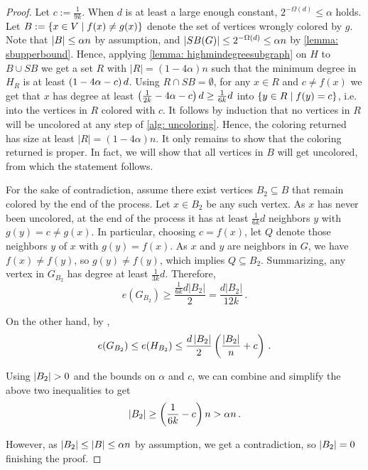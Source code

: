 
\begin{proof}
    Let $c:=\frac{1}{9k}$. When $d$ is at least a large enough constant, $2^{-\Omega(d)}\leq \alpha$ holds. Let $B:=\left\{x\in V\mid f(x)\neq g(x)\right\}$ denote the set of vertices wrongly colored by $g$. Note that $\left\lvert B\right\rvert\leq \alpha n$ by assumption, and $\left\lvert SB(G)\right\rvert\leq 2^{-\Omega(d)}\leq \alpha n$ by \cref{lemma: sbupperbound}. Hence, applying \cref{lemma: highmindegreesubgraph} on $H$ to $B\cup SB$ we get a set $R$ with $|R|=(1-4\alpha)n$ such that the minimum degree in $H_R$ is at least $\left(1-4\alpha-c\right)d$. Using $R\cap SB=\emptyset$, for any $x\in R$ and $c\neq f(x)$ we get that $x$ has degree at least $\left(\frac{1}{2k}-4\alpha-c\right)d\geq \frac{1}{6k}d$ into $\left\{y\in R\mid f(y)=c\right\}$, i.e. into the vertices in $R$ colored with $c$. It follows by induction that no vertices in $R$ will be uncolored at any step of \cref{alg: uncoloring}. Hence, the coloring returned has size at least $|R|=(1-4\alpha)n$. It only remains to show that the coloring returned is proper. In fact, we will show that all vertices in $B$ will get uncolored, from which the statement follows.

    For the sake of contradiction, assume there exist vertices $B_2\subseteq B$ that remain colored by the end of the process. Let $x\in B_2$ be any such vertex. As $x$ has never been uncolored, at the end of the process it has at least $\frac{1}{6k}d$ neighbors $y$ with $g(y)=c\neq g(x)$. In particular, choosing $c=f(x)$, let $Q$ denote those neighbors $y$ of $x$ with $g(y)=f(x)$. As $x$ and $y$ are neighbors in $G$, we have $f(x)\neq f(y)$, so $g(y)\neq f(y)$, which implies $Q\subseteq B_2$. Summarizing, any vertex in $G_{B_2}$ has degree at least $\frac{1}{3k}d$. Therefore, $$e(G_{B_2})\geq \frac{\frac{1}{6k}d|B_2|}{2}= \frac{d|B_2|}{12k}\,.$$

    On the other hand, by , $$e(G_{B_2})\leq e(H_{B_2})\leq \frac{d\left\lvert B_2\right\rvert}{2}\left(\frac{\left\lvert B_2\right\rvert}{n}+c\right)\,.$$
    
    Using $\left\lvert B_2\right\rvert>0$ and the bounds on $\alpha$ and $c$, we can combine and simplify the above two inequalities to get $$\left\lvert B_2\right\rvert\geq \left(\frac{1}{6k}-c\right)n> \alpha n\,.$$

    However, as $\left\lvert B_2\right\rvert\leq \left\lvert B\right\rvert\leq \alpha n$ by assumption, we get a contradiction, so $\left\lvert B_2\right\rvert=0$ finishing the proof.
\end{proof}


